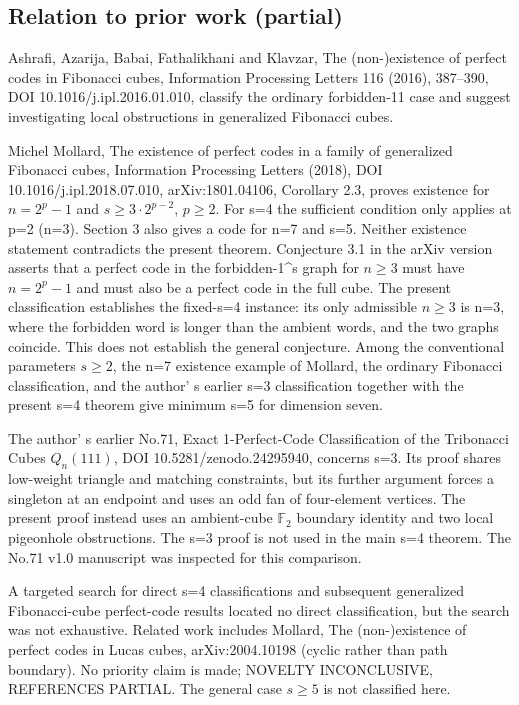 \documentclass[
]{article}
\begin{document}
\subsection{Relation to prior work
(partial)}\label{relation-to-prior-work-partial}

Ashrafi, Azarija, Babai, Fathalikhani and Klavzar, The (non-)existence
of perfect codes in Fibonacci cubes, Information Processing Letters 116
(2016), 387--390, DOI 10.1016/j.ipl.2016.01.010, classify the ordinary
forbidden-11 case and suggest investigating local obstructions in
generalized Fibonacci cubes.

Michel Mollard, The existence of perfect codes in a family of
generalized Fibonacci cubes, Information Processing Letters (2018), DOI
10.1016/j.ipl.2018.07.010, arXiv:1801.04106, Corollary 2.3, proves
existence for \(n=2^p-1\) and \(s\geq 3\cdot 2^{p-2}\), \(p\geq 2\). For
s=4 the sufficient condition only applies at p=2 (n=3). Section 3 also
gives a code for n=7 and s=5. Neither existence statement contradicts
the present theorem. Conjecture 3.1 in the arXiv version asserts that a
perfect code in the forbidden-1\^{}s graph for \(n\geq 3\) must have
\(n=2^p-1\) and must also be a perfect code in the full cube. The
present classification establishes the fixed-s=4 instance: its only
admissible \(n\geq 3\) is n=3, where the forbidden word is longer than
the ambient words, and the two graphs coincide. This does not establish
the general conjecture. Among the conventional parameters \(s\geq 2\),
the n=7 existence example of Mollard, the ordinary Fibonacci
classification, and the author' s earlier s=3
classification together with the present s=4 theorem give minimum s=5
for dimension seven.

The author' s earlier No.71, Exact 1-Perfect-Code
Classification of the Tribonacci Cubes \(Q_n(111)\), DOI
10.5281/zenodo.24295940, concerns s=3. Its proof shares low-weight
triangle and matching constraints, but its further argument forces a
singleton at an endpoint and uses an odd fan of four-element vertices.
The present proof instead uses an ambient-cube \(\mathbb{F}_2\) boundary
identity and two local pigeonhole obstructions. The s=3 proof is not
used in the main s=4 theorem. The No.71 v1.0 manuscript was inspected
for this comparison.

A targeted search for direct s=4 classifications and subsequent
generalized Fibonacci-cube perfect-code results located no direct
classification, but the search was not exhaustive. Related work includes
Mollard, The (non-)existence of perfect codes in Lucas cubes,
arXiv:2004.10198 (cyclic rather than path boundary). No priority claim
is made; NOVELTY INCONCLUSIVE, REFERENCES PARTIAL. The general case
\(s\geq 5\) is not classified here.
\end{document}
